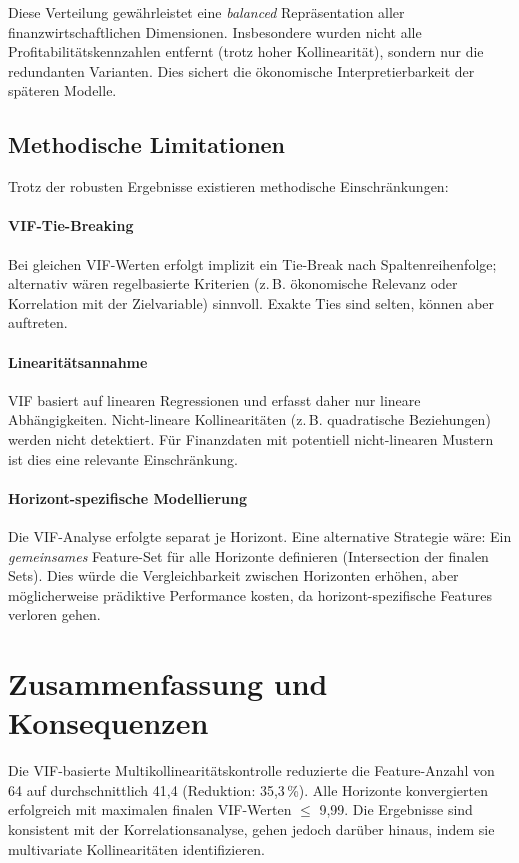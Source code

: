 Diese Verteilung gewährleistet eine \textit{balanced} Repräsentation aller finanzwirtschaftlichen Dimensionen. Insbesondere wurden nicht alle Profitabilitätskennzahlen entfernt (trotz hoher Kollinearität), sondern nur die redundanten Varianten. Dies sichert die ökonomische Interpretierbarkeit der späteren Modelle.

\subsection{Methodische Limitationen}

Trotz der robusten Ergebnisse existieren methodische Einschränkungen:

\paragraph{VIF-Tie-Breaking} Bei gleichen VIF-Werten erfolgt implizit ein Tie-Break nach Spaltenreihenfolge; alternativ wären regelbasierte Kriterien (z.\,B. ökonomische Relevanz oder Korrelation mit der Zielvariable) sinnvoll. Exakte Ties sind selten, können aber auftreten.

\paragraph{Linearitätsannahme} VIF basiert auf linearen Regressionen und erfasst daher nur lineare Abhängigkeiten. Nicht-lineare Kollinearitäten (z.\,B. quadratische Beziehungen) werden nicht detektiert. Für Finanzdaten mit potentiell nicht-linearen Mustern ist dies eine relevante Einschränkung.

\paragraph{Horizont-spezifische Modellierung} Die VIF-Analyse erfolgte separat je Horizont. Eine alternative Strategie wäre: Ein \textit{gemeinsames} Feature-Set für alle Horizonte definieren (Intersection der finalen Sets). Dies würde die Vergleichbarkeit zwischen Horizonten erhöhen, aber möglicherweise prädiktive Performance kosten, da horizont-spezifische Features verloren gehen.

\section{Zusammenfassung und Konsequenzen}

Die VIF-basierte Multikollinearitätskontrolle reduzierte die Feature-Anzahl von 64 auf durchschnittlich 41,4 (Reduktion: 35,3\,\%). Alle Horizonte konvergierten erfolgreich mit maximalen finalen VIF-Werten $\leq$ 9,99. Die Ergebnisse sind konsistent mit der Korrelationsanalyse, gehen jedoch darüber hinaus, indem sie multivariate Kollinearitäten identifizieren.

